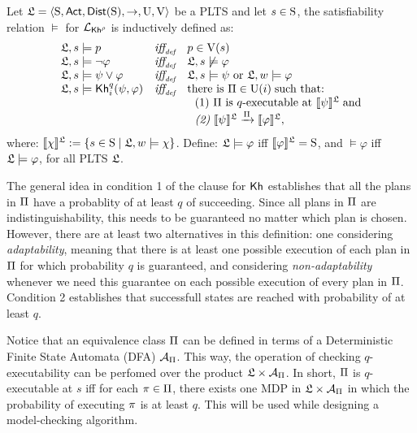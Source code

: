 \begin{definition} \label{def:semantics}
    Let $\model = \tup{\S,\ACT,\dist(\S),\ra,\Unc,\V}$ be a PLTS and let $s\in\S$, the satisfiability relation $\models$ for $\PKh$ is inductively defined as:
    \[
    \begin{array}{l@{\ \ \ }c@{\ \ \  }l}
    \model, s \models p & \iffdef & p \in \V(s) \\
    \model, s\models \neg\varphi & \iffdef & \model, s \not\models \varphi \\
    \model, s \models \psi\vee\varphi & \iffdef & \model, s \models \psi \mbox{ or }\model, w \models \varphi \\
    \model, s \models \kh_i^q(\psi,\varphi) & \iffdef & \text{there is } \plans \in \Unc(i) \;\text{such that:} \\
    & & \ \ \text{\rm (1)} \ \plans \text{ is $q$-executable at }  \truthset{\model}{\psi}\; \text{and} \\
    & & \ \ \text{\em (2)} \ \truthset{\model}{\psi} \reach{\plans} \truthset{\model}{\varphi}, 
    \end{array}
    \]     
    \noindent where: $\truthset{\model}{\chi} := \csetsc{s\in\S}{\model,w\models\chi}$. Define: $\model\models\varphi$ iff  $\truthset{\model}{\varphi}=\S$, and $\models\varphi$ iff $\model\models\varphi$, for all PLTS $\model$.
\end{definition}

The general idea in condition 1 of the clause for $\kh$ establishes that all the plans in $\plans$ have a probablity of at least $q$ of succeeding. Since all plans in $\plans$ are indistinguishability, this needs to be guaranteed no matter which plan is chosen. However, there are at least two alternatives in this definition: one considering \emph{adaptability}, meaning that there is at least one possible execution of each plan in $\plans$ for which probability $q$ is guaranteed, and considering \emph{non-adaptability} whenever we need this guarantee on each possible execution of every plan in $\plans$. Condition 2 establishes that successfull states are reached with probability of at least $q$.

\begin{remark}
    Notice that an equivalence class $\plans$ can be defined in terms of a Deterministic Finite State Automata (DFA) $\mathcal{A}_{\plans}$. This way, the operation of checking $q$-executability can be perfomed over the product $\model\times\mathcal{A}_{\plans}$. In short, $\plans$ is $q$-executable at $s$ iff for each $\plan\in\plans$, there exists one MDP in  $\model\times\mathcal{A}_{\plans}$ in which the probability of executing $\plan$ is at least $q$. This will be used while designing a model-checking algorithm.
\end{remark}